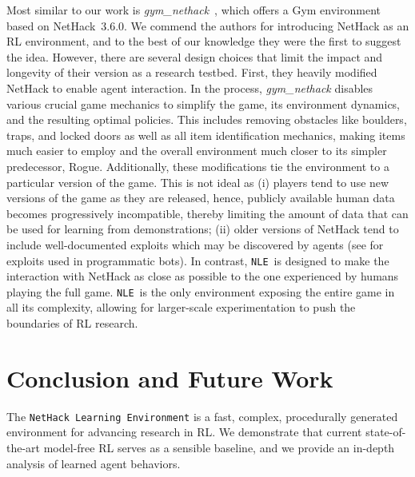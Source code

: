\documentclass{article}
\newcommand{\nethack}{NetHack}
\newcommand{\nethackenv}{\texttt{NetHack Learning Environment}}
\newcommand{\NLE}{\texttt{NLE}}
\begin{document}
Most similar to our work is \emph{gym\_nethack}~\citep{campbell-17-learning, campbell2018exploration}, which offers a Gym environment based on \nethack~3.6.0. We commend the authors for introducing NetHack as an RL environment, and to the best of our knowledge they were the first to suggest the idea. However, there are several design choices that limit the impact and longevity of their version as a research testbed.
First, they heavily modified \nethack{} to enable agent interaction. In the process, \emph{gym\_nethack} disables various crucial game mechanics to simplify the game, its environment dynamics, and the resulting optimal policies.
This includes removing obstacles like boulders, traps, and locked doors as well as all item identification mechanics, making items much easier to employ and the overall environment much closer to its simpler predecessor, Rogue.
Additionally, these modifications tie the environment to a particular version of the game. This is not ideal as
(i) players tend to use new versions of the game as they are released, hence, publicly available human data becomes progressively incompatible, thereby limiting the amount of data that can be used for learning from demonstrations;
(ii) older versions of \nethack{} tend to include well-documented exploits which
may be discovered by agents (see  for exploits used in programmatic bots).
In contrast, \NLE\ is designed to make the interaction with \nethack{} as close as possible to the one experienced by humans playing the full game.
\NLE\ is the only environment exposing the entire game in all its complexity, allowing for larger-scale experimentation to push the boundaries of RL research.

\section{Conclusion and Future Work}

The \nethackenv{} is a fast, complex, procedurally
generated environment for advancing research in RL. We demonstrate that current
state-of-the-art model-free RL serves as a sensible baseline, and
we provide an in-depth analysis of learned agent behaviors.
\end{document}
